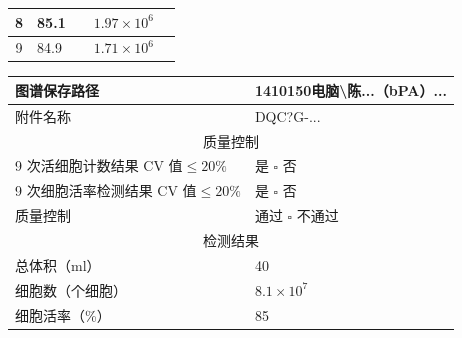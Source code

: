 \documentclass[UTF8,10pt,a4paper,fontset=fandol]{ctexart}
\newcommand{\fieldvalue}[1]{#1}
\newcommand{\handwritten}[1]{#1}
\begin{document}
\begin{center}
\begin{center}
\begin{tabularx}{\textwidth}{|c|X|X|X|X|}
\hline
8 &
\fieldvalue{\handwritten{85.1}} &
&
\fieldvalue{\handwritten{$1.97\times10^{6}$}} & \\
\hline
9 &
\fieldvalue{\handwritten{84.9}} &
&
\fieldvalue{\handwritten{$1.71\times10^{6}$}} & \\
\hline
\end{tabularx}
\normalsize

\begin{tabularx}{\textwidth}{|p{}|X|}
\hline
图谱保存路径 &
\fieldvalue{\handwritten{1410150电脑\textbackslash 陈...（bPA）...}} \\
\hline
附件名称 &
\fieldvalue{\handwritten{DQC?G-...}} \\
\hline
\multicolumn{2}{|c|}{质量控制} \\
\hline
9 次活细胞计数结果 CV 值$\leq 20\%$ &
\fieldvalue{\handwritten{\checkmark}} 是 \quad $\square$ 否 \\
\hline
9 次细胞活率检测结果 CV 值$\leq 20\%$ &
\fieldvalue{\handwritten{\checkmark}} 是 \quad $\square$ 否 \\
\hline
质量控制 &
\fieldvalue{\handwritten{\checkmark}} 通过 \quad $\square$ 不通过 \\
\hline
\multicolumn{2}{|c|}{检测结果} \\
\hline
总体积（ml） &
\fieldvalue{\handwritten{40}} \\
\hline
细胞数（个细胞） &
\fieldvalue{\handwritten{$8.1\times10^{7}$}} \\
\hline
细胞活率（\%） &
\fieldvalue{\handwritten{85}} \\

\end{tabularx}
\end{center}
\end{center}
\end{document}
